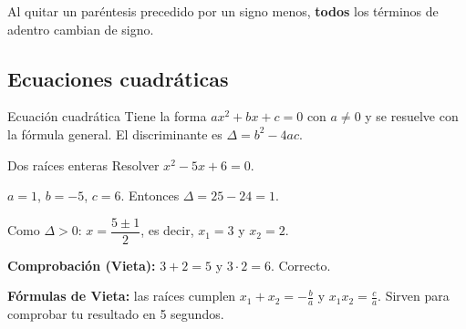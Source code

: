 \begin{tmcuidado}Al quitar un par\'entesis precedido por un signo menos, \textbf{todos} los t\'erminos de adentro cambian de signo.\end{tmcuidado}

\subsection{Ecuaciones cuadr\'aticas}
\begin{tmdef}{Ecuaci\'on cuadr\'atica}
Tiene la forma $ax^2+bx+c=0$ con $a\neq 0$ y se resuelve con la f\'ormula general. El discriminante es $\Delta=b^2-4ac$.
\end{tmdef}

\begin{center}
\end{center}

\begin{tmejemplo}{Dos ra\'ices enteras}
Resolver $x^2-5x+6=0$.
\begin{tmpasos}
\item $a=1$, $b=-5$, $c=6$. Entonces $\Delta=25-24=1$.
\item Como $\Delta>0$: $x=\dfrac{5\pm1}{2}$, es decir, $x_1=3$ y $x_2=2$.
\item \textbf{Comprobaci\'on (Vieta):} $3+2=5$ y $3\cdot2=6$. Correcto.
\end{tmpasos}
\end{tmejemplo}

\begin{tmtip}\textbf{F\'ormulas de Vieta:} las ra\'ices cumplen $x_1+x_2=-\frac{b}{a}$ y $x_1x_2=\frac{c}{a}$. Sirven para comprobar tu resultado en 5 segundos.\end{tmtip}

